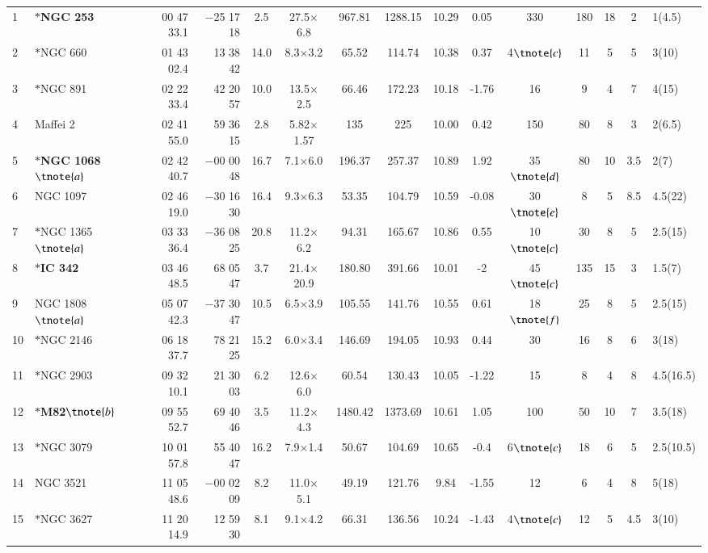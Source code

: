 \documentclass[legal,11pt]{article}
\begin{document}
\begin{table}
\begin{threeparttable}[b]
\begin{tabular}{llrrccccccccccl}
1 & $\ast${\bf NGC 253} & 00 47 33.1 & $-$25 17 18 & 2.5 & 27.5$\times$6.8 & 967.81 & 1288.15 & 10.29 & 0.05 & 330 & 180 & 18 & 2 & 1(4.5) \\
2 & $\ast$NGC 660 & 01 43 02.4 & 13 38 42 & 14.0 & 8.3$\times$3.2 & 65.52 & 114.74 & 10.38 & 0.37 & 4$\tnote{c}$ & 11 & 5 & 5 & 3(10) \\
3 & $\ast$NGC 891 & 02 22 33.4 & 42 20 57 & 10.0 & 13.5$\times$2.5 & 66.46 & 172.23 & 10.18 & -1.76 & 16 & 9 & 4 & 7 & 4(15) \\
4 & Maffei 2 & 02 41 55.0 & 59 36 15 & 2.8 & 5.82$\times$1.57 & 135 & 225 & 10.00 & 0.42 & 150 & 80 & 8 & 3 & 2(6.5) \\ 
5 & $\ast${\bf NGC 1068}$\tnote{a}$ & 02 42 40.7 & $-$00 00 48 & 16.7 & 7.1$\times$6.0 & 196.37 & 257.37 & 10.89 & 1.92 & 35$\tnote{d}$ & 80 & 10 & 3.5 & 2(7) \\
6 & NGC 1097 & 02 46 19.0 & $-$30 16 30 & 16.4 & 9.3$\times$6.3 & 53.35 & 104.79 & 10.59 & -0.08 & 30$\tnote{e}$ & 8 & 5 & 8.5 & 4.5(22) \\
7 & $\ast$NGC 1365$\tnote{a}$ & 03 33 36.4 & $-$36 08 25 & 20.8 & 11.2$\times$6.2 & 94.31 & 165.67 & 10.86 & 0.55 & 10$\tnote{c}$ & 30 & 8 & 5 & 2.5(15) \\
8 & $\ast${\bf IC 342} & 03 46 48.5 & 68 05 47 & 3.7 & 21.4$\times$20.9 & 180.80 & 391.66 & 10.01 & -2 & 45$\tnote{c}$ & 135 & 15 & 3 & 1.5(7) \\
9 & NGC 1808$\tnote{a}$ & 05 07 42.3 & $-$37 30 47 & 10.5 & 6.5$\times$3.9 & 105.55 & 141.76 & 10.55 & 0.61 & 18$\tnote{f}$ & 25 & 8 & 5 & 2.5(15) \\
10 & $\ast$NGC 2146 & 06 18 37.7 & 78 21 25 & 15.2 & 6.0$\times$3.4 & 146.69 & 194.05 & 10.93 & 0.44 & 30 & 16 & 8 & 6 & 3(18) \\
11 & $\ast$NGC 2903 & 09 32 10.1 & 21 30 03 & 6.2 & 12.6$\times$6.0 & 60.54 & 130.43 & 10.05 & -1.22 & 15 & 8 & 4 & 8 & 4.5(16.5) \\
12 & $\ast${\bf M82}$\tnote{b}$ & 09 55 52.7 & 69 40 46 & 3.5 & 11.2$\times$4.3 & 1480.42 & 1373.69 & 10.61 & 1.05 & 100 & 50 & 10 & 7 & 3.5(18) \\
13 & $\ast$NGC 3079 & 10 01 57.8 & 55 40 47 & 16.2 & 7.9$\times$1.4 & 50.67 & 104.69 & 10.65 & -0.4 & 6$\tnote{c}$ & 18 & 6 & 5 & 2.5(10.5) \\
14 & NGC 3521 & 11 05 48.6 & $-$00 02 09 & 8.2 & 11.0$\times$5.1 & 49.19 & 121.76 & 9.84 & -1.55 & 12 & 6 & 4 & 8 & 5(18) \\
15 & $\ast$NGC 3627 & 11 20 14.9 & 12 59 30 & 8.1 & 9.1$\times$4.2 & 66.31 & 136.56 & 10.24 & -1.43 & 4$\tnote{c}$ & 12 & 5 & 4.5 & 3(10) \\

\end{tabular}
\end{threeparttable}
\end{table}
\end{document}
